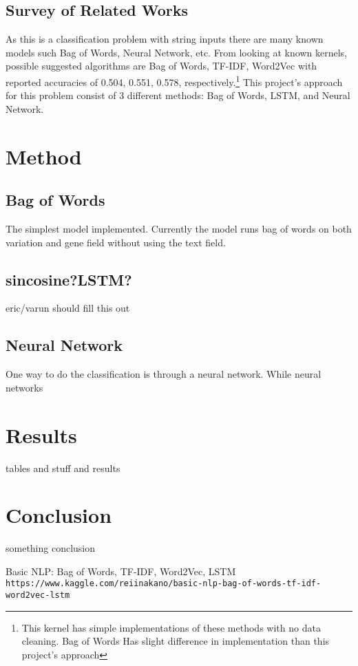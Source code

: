 \documentclass{article}
\begin{document}
    \subsection{Survey of Related Works}
    As this is a classification problem with string inputs there are many known models such Bag of Words, Neural Network, etc.  From looking at known kernels, possible suggested algorithms are Bag of Words, TF-IDF, Word2Vec with reported accuracies of 0.504, 0.551, 0.578, respectively.\footnote{This kernel has simple implementations of these methods with no data cleaning.  Bag of Words Has slight difference in implementation than this project's approach}  This project's approach for this problem consist of 3 different methods: Bag of Words, LSTM, and Neural Network.  
    
    \section{Method}
    \subsection{Bag of Words}
    The simplest model implemented.  Currently the model runs bag of words on both variation and gene field without using the text field.  
    \subsection{sincosine?LSTM?}
    eric/varun should fill this out
    \subsection{Neural Network}
    One way to do the classification is through a neural network.  While neural networks
    
    
    
    \section{Results}
    tables and stuff and results
    
    \section{Conclusion}
    something conclusion
    
    \pagebreak
    \begin{thebibliography}{9}
        Basic NLP: Bag of Words, TF-IDF, Word2Vec, LSTM
        \\\texttt{https://www.kaggle.com/reiinakano/basic-nlp-bag-of-words-tf-idf-word2vec-lstm}
      
         
    \end{thebibliography}
    
    
\end{document}
